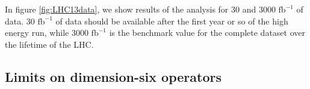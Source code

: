 \documentclass[preprint]{JHEP3}
\def\invfb {\mathrm{fb}^{-1}}
\begin{document}
In figure \ref{fig:LHC13data}, we show results of the analysis for 30 and 3000 $\invfb$ of data. 30 $\invfb$ of data should be available after 
the first year or so of the high energy run, while 3000 $\invfb$ is the benchmark value for the complete dataset over the lifetime of the LHC. 





\subsection{Limits on dimension-six operators}
\label{DimSixLimits}
\end{document}
